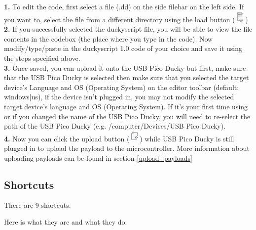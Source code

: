 \documentclass[a4paper,12pt]{article}
\begin{document}
\ \\
\\\textbf{1.} To edit the code, first select a file (.dd) on the side filebar on the left side. If you want to, select the file from a different directory using the load button (\includegraphics[width=5.5mm]{pictures/black_bk/load.png})
\\\textbf{2.} If you successfully selected the duckyscript file, you will be able to view the file contents in the codebox (the place where you type in the code). Now modify/type/paste in the duckyscript 1.0 code of your choice and save it using the steps specified above.
\\\textbf{3.} Once saved, you can upload it onto the USB Pico Ducky but first, make sure that the USB Pico Ducky is selected then make sure that you selected the target device's Language and OS (Operating System) on the editor toolbar (default: windows|us), if the device isn't plugged in, you may not modify the selected target device's language and OS (Operating System). If it's your first time using or if you changed the name of the USB Pico Ducky, you will need to re-select the path of the USB Pico Ducky (e.g. /computer/Devices/USB Pico Ducky).
\\\textbf{4.} Now you can click the upload button (\includegraphics[width=5.5mm]{pictures/black_bk/upload.png}) while USB Pico Ducky is still plugged in to upload the payload to the microcontroller. More information about uploading payloads can be found in section \ref{upload_payloads}

\subsection{Shortcuts}

There are 9 shortcuts.

Here is what they are and what they do:
\end{document}
